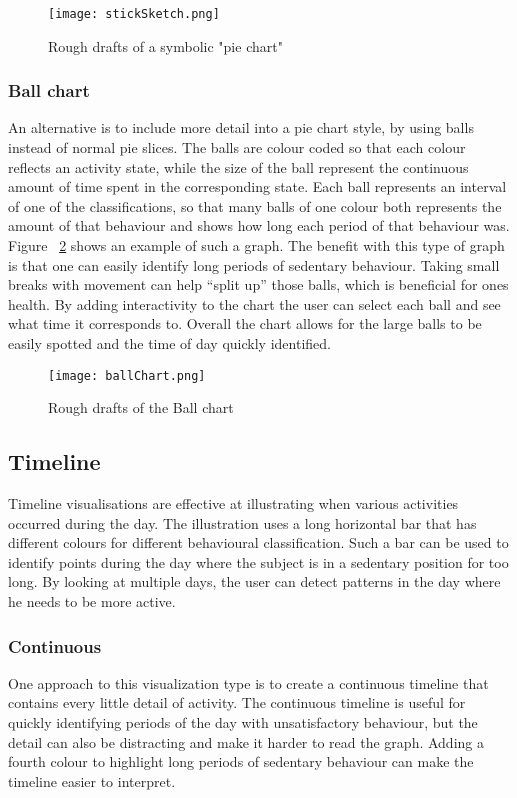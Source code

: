 \begin{figure}[h!]
	\centering
		\texttt{[image: stickSketch.png]}
		\caption{\footnotesize Rough drafts of a symbolic "pie chart"}
		\label{fig:symbolicPie}
\end{figure}

\subsubsection{Ball chart}
An alternative is to include more detail into a pie chart style, by using balls instead of normal pie slices. The balls are colour coded so that each colour reflects an activity state, while the size of the ball represent the continuous amount of time spent in the corresponding state. Each ball represents an interval of one of the classifications, so that many balls of one colour both represents the amount of that behaviour and shows how long each period of that behaviour was. Figure ~\ref{fig:ballChart}
shows an example of such a graph. The benefit with this type of graph is that one can easily identify long periods of sedentary behaviour. Taking small breaks with movement can help ``split up'' those balls, which is beneficial for ones health. By adding interactivity to the chart the user can select each ball and see what time it corresponds to. Overall the chart allows for the large balls to be easily spotted and the time of day quickly identified.

\begin{figure}[h!]
	\centering
		\texttt{[image: ballChart.png]}
		\caption{\footnotesize Rough drafts of the Ball chart}
		\label{fig:ballChart}
\end{figure}


\subsection{Timeline}
Timeline visualisations are effective at illustrating when various activities occurred during the day. The illustration uses a long horizontal bar that has different colours for different behavioural classification. Such a bar can be used to identify points during the day where the subject is in a sedentary position for too long. By looking at multiple days, the user can detect patterns in the day where he needs to be more active.

\subsubsection{Continuous}
One approach to this visualization type is to create a continuous timeline that contains every little detail of activity. The continuous timeline is useful for quickly identifying periods of the day with unsatisfactory behaviour, but the detail can also be distracting and make it harder to read the graph. Adding a fourth colour to highlight long periods of sedentary behaviour can make the timeline easier to interpret.

